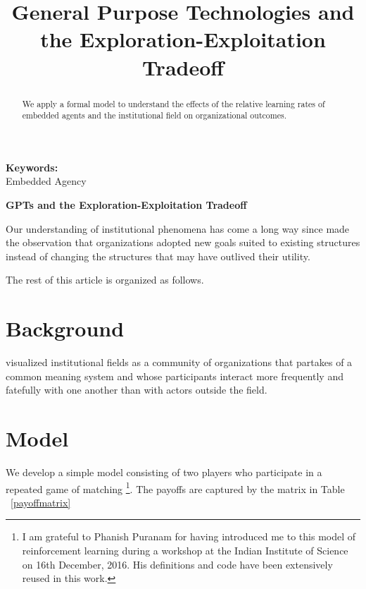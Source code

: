 \documentclass[12pt,letterpaper]{article}
\begin{document}
\title{General Purpose Technologies and the Exploration-Exploitation Tradeoff}
\date{}
\maketitle

\begin{abstract} 
\normalsize 
We apply a formal model to understand the effects of the relative learning rates of embedded agents and the institutional field on organizational outcomes. 
\end{abstract}


{\textbf{Keywords:} \\\indent Embedded Agency}

\newpage
\pagestyle{fancy}
\fancyhf{}
\rhead{\thepage}

\begin{center}
\textbf{GPTs and the Exploration-Exploitation Tradeoff}
\end{center}
Our understanding of  institutional phenomena has come a long way since \cite{Selznick1957} made the observation that organizations adopted new goals suited to existing structures  instead of changing the structures that may have outlived their utility. 

The rest of this article is organized as follows. 

\section{Background}
 \cite{Scott1995} visualized institutional fields as a community of organizations that partakes of a common meaning system and whose participants interact more frequently and fatefully with one another than with actors outside the field. 
 
\section{Model}

We develop a simple model consisting of two players who participate in a repeated game of matching \footnote{I am grateful to Phanish Puranam for having introduced me to this model of reinforcement learning during a workshop at the Indian Institute of Science on 16th December, 2016. His definitions and code have been extensively reused in this work.}. The payoffs are captured by the matrix in Table ~\ref{payoffmatrix}
\end{document}
